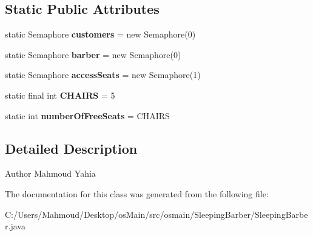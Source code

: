 \subsection*{Static Public Attributes}
\begin{DoxyCompactItemize}
\item 
static Semaphore {\bfseries customers} = new Semaphore(0)\hypertarget{classosmain_1_1_sleeping_barber_1_1_sleeping_barber_a7b8a8b6b585d68fc47ba92c32fe16913}{}\label{classosmain_1_1_sleeping_barber_1_1_sleeping_barber_a7b8a8b6b585d68fc47ba92c32fe16913}

\item 
static Semaphore {\bfseries barber} = new Semaphore(0)\hypertarget{classosmain_1_1_sleeping_barber_1_1_sleeping_barber_a13ddfe1cd2398e81d3a049ac453f5b86}{}\label{classosmain_1_1_sleeping_barber_1_1_sleeping_barber_a13ddfe1cd2398e81d3a049ac453f5b86}

\item 
static Semaphore {\bfseries access\+Seats} = new Semaphore(1)\hypertarget{classosmain_1_1_sleeping_barber_1_1_sleeping_barber_ae4cee64fc4f34a6b5ee2b5fffbc2ff09}{}\label{classosmain_1_1_sleeping_barber_1_1_sleeping_barber_ae4cee64fc4f34a6b5ee2b5fffbc2ff09}

\item 
static final int {\bfseries C\+H\+A\+I\+RS} = 5\hypertarget{classosmain_1_1_sleeping_barber_1_1_sleeping_barber_a76747d7e779ab9435bfa7541efc558d4}{}\label{classosmain_1_1_sleeping_barber_1_1_sleeping_barber_a76747d7e779ab9435bfa7541efc558d4}

\item 
static int {\bfseries number\+Of\+Free\+Seats} = C\+H\+A\+I\+RS\hypertarget{classosmain_1_1_sleeping_barber_1_1_sleeping_barber_a46555ca23de5486601d06db755ae0ef7}{}\label{classosmain_1_1_sleeping_barber_1_1_sleeping_barber_a46555ca23de5486601d06db755ae0ef7}

\end{DoxyCompactItemize}


\subsection{Detailed Description}
\begin{DoxyAuthor}{Author}
Mahmoud Yahia 
\end{DoxyAuthor}


The documentation for this class was generated from the following file\+:\begin{DoxyCompactItemize}
\item 
C\+:/\+Users/\+Mahmoud/\+Desktop/os\+Main/src/osmain/\+Sleeping\+Barber/Sleeping\+Barber.\+java\end{DoxyCompactItemize}
